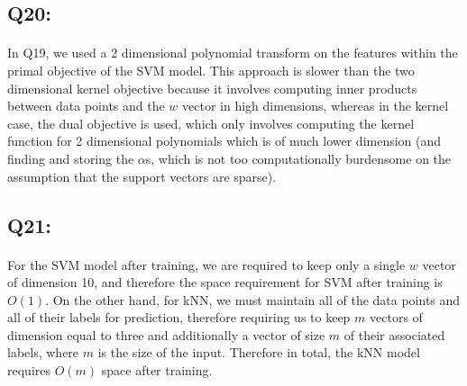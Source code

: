 \documentclass{article}
\begin{document}
\subsection*{Q20:}
    \paragraph*{}
    In Q19, we used a 2 dimensional polynomial transform on the features within the primal objective of the SVM model. This approach is slower than the two dimensional kernel objective because it involves computing inner products between data points and the $w$ vector in high dimensions, whereas in the kernel case, the dual objective is used, which only involves computing the kernel function for 2 dimensional polynomials which is of much lower dimension (and finding and storing the $\alpha$s, which is not too computationally burdensome on the assumption that the support vectors are sparse).
\subsection*{Q21:}
    \paragraph*{}
    For the SVM model after training, we are required to keep only a single $w$ vector of dimension 10, and therefore the space requirement for SVM after training is $O(1)$.
    On the other hand, for kNN, we must maintain all of the data points and all of their labels for prediction, therefore requiring us to keep $m$ vectors of dimension equal to three and additionally a vector of size $m$ of their associated labels, where $m$ is the size of the input. Therefore in total, the kNN model requires $O(m)$ space after training.
\end{document}
